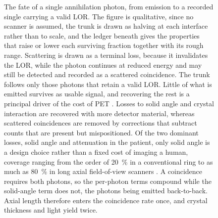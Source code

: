 \begin{figure}[p]
	\centering
	
	\caption[What governs the fate of an annihilation photon]{%
		The fate of a single  annihilation photon, from emission to a recorded single carrying a valid LOR.
		The figure is qualitative, since no scanner is assumed, the trunk is drawn as halving at each interface rather than to scale, and the ledger beneath gives the properties that raise or lower each surviving fraction together with its rough range.
		Scattering is drawn as a terminal loss, because it invalidates the LOR, while the photon continues at reduced energy and may still be detected and recorded as a scattered coincidence.
		The trunk follows only those photons that retain a valid LOR.
		Little of what is emitted survives as usable signal, and recovering the rest is a principal driver of the cost of PET .
		Losses to solid angle and crystal interaction are recovered with more detector material, whereas scattered coincidences are removed by corrections that subtract counts that are present but mispositioned.
		Of the two dominant losses, solid angle and attenuation in the patient, only solid angle is a design choice rather than a fixed cost of imaging a human, coverage ranging from the order of \qty{20}{\percent} in a conventional ring to as much as \qty{80}{\percent} in long axial field-of-view scanners \cite{Vandenberghe2020}.
		A coincidence requires both photons, so the per-photon terms compound while the solid-angle term does not, the photons being emitted back-to-back.
		Axial length therefore enters the coincidence rate once, and crystal thickness and light yield twice.}
	\label{fig:photon-flow}
\end{figure}

